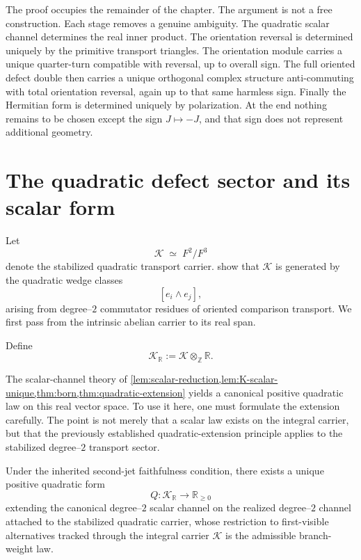 The proof occupies the remainder of the chapter.
The argument is not a free construction.
Each stage removes a genuine ambiguity.
The quadratic scalar channel determines the real inner product.
The orientation reversal is determined uniquely by the primitive transport
triangles.
The orientation module carries a unique quarter-turn compatible with
reversal, up to overall sign.
The full oriented defect double then carries a unique orthogonal complex
structure anti-commuting with total orientation reversal, again up to
that same harmless sign.
Finally the Hermitian form is determined uniquely by polarization.
At the end nothing remains to be chosen except the sign
\(J\mapsto -J\), and that sign does not represent additional geometry.
\section{The quadratic defect sector and its scalar form}
\label{sec:hilbert-quadratic-sector}
Let
\[
	\mathcal K \;\simeq\; F^{2}/F^{3}
\]
denote the stabilized quadratic transport carrier.
 show that
\(\mathcal K\) is generated by the quadratic
wedge classes
\[
	[e_i\wedge e_j],
\]
arising from degree--\(2\) commutator residues of oriented comparison
transport.
We first pass from the intrinsic abelian carrier to its real span.
\begin{definition}
	Define
	\[
		\mathcal K_{\mathbb R}
		:=
		\mathcal K\otimes_{\mathbb Z}\mathbb R.
	\]
\end{definition}
The scalar-channel theory of
\cref{lem:scalar-reduction,lem:K-scalar-unique,thm:born,thm:quadratic-extension}
yields a canonical
positive quadratic law on this real vector space.
To use it here, one must formulate the extension carefully.
The point is not merely that a scalar law exists on the integral
carrier, but that the previously established quadratic-extension
principle applies to the stabilized degree--\(2\) transport sector.
\begin{theorem}
	\label{thm:quadratic-scalar}
	Under the inherited second-jet faithfulness condition, there exists a
	unique positive quadratic form
	\[
		Q:\mathcal K_{\mathbb R}\to\mathbb R_{\ge 0}
	\]
	extending the canonical degree--\(2\) scalar channel on the
	realized degree--\(2\) channel attached to the stabilized quadratic
	carrier, whose restriction to first-visible alternatives tracked
	through the integral carrier \(\mathcal K\) is the admissible
	branch-weight law.
\end{theorem}
